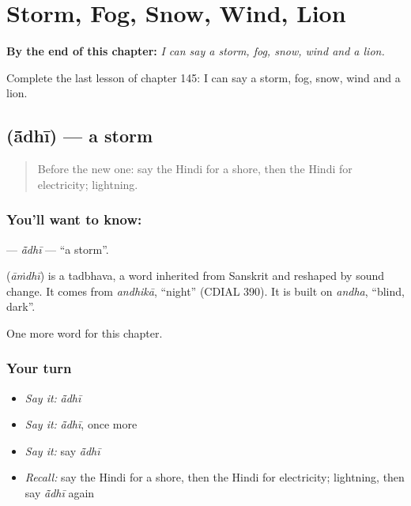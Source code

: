 
\chapter{Storm, Fog, Snow, Wind, Lion}
\label{ch:hi-storm-fog-snow-wind-lion}

\begin{chapteropening}
\textbf{By the end of this chapter:} \emph{I can say a storm, fog, snow, wind and a lion.}

Complete the last lesson of chapter 145: I can say a storm, fog, snow, wind and a lion.
\end{chapteropening}

\section[\texorpdfstring{\hi{आँधी} (ā̃dhī)}{आँधी (ā̃dhī)}]{ (ā̃dhī) — a storm}

\label{lesson:HI-C145-adhi}



\begin{quote}
Before the new one: say the Hindi for a shore, then the Hindi for electricity; lightning.
\end{quote}

\subsection*{You'll want to know: }
\textbf{} — \emph{ā̃dhī} — \textquotedblleft{}a storm\textquotedblright{}.

\begin{cousinweb}
\textbf{} (\emph{āṁdhī}) is a tadbhava, a word inherited from Sanskrit and reshaped by sound change. It comes from \emph{andhikā}, \textquotedblleft{}night\textquotedblright{} (CDIAL 390). It is built on \emph{andha}, \textquotedblleft{}blind, dark\textquotedblright{}.
\end{cousinweb}

\begin{grammarlens}[title={What you've built}]
One more word for this chapter.
\end{grammarlens}

\subsection*{Your turn}
\begin{itemize}
\raggedright
  \item \emph{Say it:} \emph{ā̃dhī}
  \item \emph{Say it:} \emph{ā̃dhī}, once more
  \item \emph{Say it:} say \emph{ā̃dhī}
  \item \emph{Recall:} say the Hindi for a shore, then the Hindi for electricity; lightning, then say \emph{ā̃dhī} again
\end{itemize}

